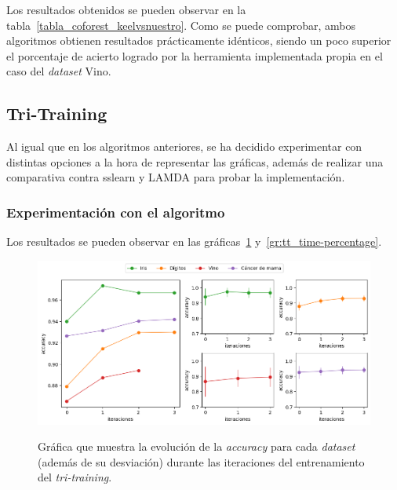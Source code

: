 Los resultados obtenidos se pueden observar en la tabla~\ref{tabla_coforest_keelvsnuestro}. Como se puede comprobar, ambos algoritmos obtienen resultados prácticamente idénticos, siendo un poco superior el porcentaje de acierto logrado por la herramienta implementada propia en el caso del \textit{dataset} Vino.


\subsection{Tri-Training}

Al igual que en los algoritmos anteriores, se ha decidido experimentar con distintas opciones a la hora de representar las gráficas, además de realizar una comparativa contra sslearn y LAMDA para probar la implementación.


\subsubsection{Experimentación con el algoritmo}

Los resultados se pueden observar en las gráficas~\ref{gr:tt_train-iterations} y~\ref{gr:tt_time-percentage}.

\begin{figure}[h]
	\caption[\textit{Tri-training}: resultados (iteraciones-entrenamiento)]{Gráfica que muestra la evolución de la \textit{accuracy} para cada \textit{dataset} (además de su desviación) durante las iteraciones del entrenamiento del \textit{tri-training}.}
	\centering
	\includegraphics[scale=0.5]{../img/memoria/5_tritraining_score-iteraciones}
	\label{gr:tt_train-iterations}
\end{figure}

